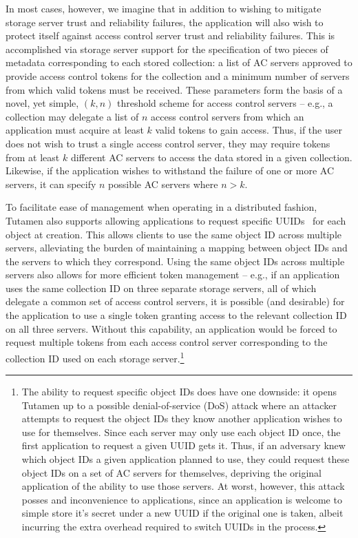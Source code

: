In most cases, however, we imagine that in addition to wishing to
mitigate storage server trust and reliability failures, the
application will also wish to protect itself against access control
server trust and reliability failures. This is accomplished via
storage server support for the specification of two pieces of metadata
corresponding to each stored collection: a list of AC servers approved
to provide access control tokens for the collection and a minimum
number of servers from which valid tokens must be received. These
parameters form the basis of a novel, yet simple, $(k, n)$ threshold
scheme for access control servers -- e.g., a collection may delegate a
list of $n$ access control servers from which an application must
acquire at least $k$ valid tokens to gain access. Thus, if the user
does not wish to trust a single access control server, they may
require tokens from at least $k$ different AC servers to access the
data stored in a given collection. Likewise, if the application wishes
to withstand the failure of one or more AC servers, it can specify $n$
possible AC servers where $n > k$.

To facilitate ease of management when operating in a distributed
fashion, Tutamen also supports allowing applications to request
specific UUIDs~\cite{leach2005} for each object at creation.  This
allows clients to use the same object ID across multiple servers,
alleviating the burden of maintaining a mapping between object IDs and
the servers to which they correspond. Using the same object IDs across
multiple servers also allows for more efficient token management --
e.g., if an application uses the same collection ID on three separate
storage servers, all of which delegate a common set of access control
servers, it is possible (and desirable) for the application to use a
single token granting access to the relevant collection ID on all
three servers. Without this capability, an application would be forced
to request multiple tokens from each access control server
corresponding to the collection ID used on each storage
server.\footnote{The ability to request specific object IDs does have
  one downside: it opens Tutamen up to a possible denial-of-service
  (DoS) attack where an attacker attempts to request the object IDs
  they know another application wishes to use for themselves. Since
  each server may only use each object ID once, the first application
  to request a given UUID gets it. Thus, if an adversary knew which
  object IDs a given application planned to use, they could request
  these object IDs on a set of AC servers for themselves, depriving
  the original application of the ability to use those servers. At
  worst, however, this attack posses and inconvenience to
  applications, since an application is welcome to simple store it's
  secret under a new UUID if the original one is taken, albeit
  incurring the extra overhead required to switch UUIDs in the
  process.}

